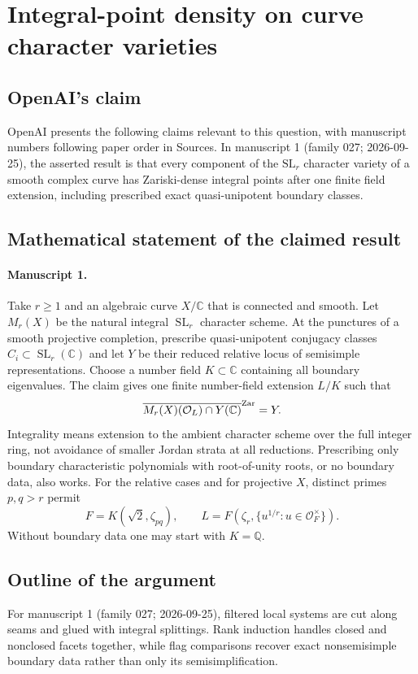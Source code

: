 \documentclass[11pt]{article}
\begin{document}
\section*{Integral-point density on curve character varieties}

\subsection{OpenAI's claim}
OpenAI presents the following claims relevant to this question, with manuscript numbers following paper order in Sources. In manuscript 1 (family 027; 2026-09-25), the asserted result is that every component of the $\mathrm{SL}_r$ character variety of a smooth complex curve has Zariski-dense integral points after one finite field extension, including prescribed exact quasi-unipotent boundary classes.

\subsection{Mathematical statement of the claimed result}
\paragraph{Manuscript 1.}
Take $r\ge1$ and an algebraic curve $X/\mathbb C$ that is connected and smooth. Let $M_r(X)$ be the natural integral $\operatorname{SL}_r$ character scheme. At the punctures of a smooth projective completion, prescribe quasi-unipotent conjugacy classes $C_i\subset\operatorname{SL}_r(\mathbb C)$ and let $Y$ be their reduced relative locus of semisimple representations. Choose a number field $K\subset\mathbb C$ containing all boundary eigenvalues. The claim gives one finite number-field extension $L/K$ such that
\[
 \overline{M_r(X)(\mathcal O_L)\cap Y(\mathbb C)}^{\rm Zar}=Y.
\]
Integrality means extension to the ambient character scheme over the full integer ring, not avoidance of smaller Jordan strata at all reductions. Prescribing only boundary characteristic polynomials with root-of-unity roots, or no boundary data, also works. For the relative cases and for projective $X$, distinct primes $p,q>r$ permit
\[
 F=K(\sqrt2,\zeta_{pq}),\qquad
 L=F(\zeta_r,\{u^{1/r}:u\in\mathcal O_F^{\times}\}).
\]
Without boundary data one may start with $K=\mathbb Q$.

\subsection{Outline of the argument}
For manuscript 1 (family 027; 2026-09-25), filtered local systems are cut along seams and glued with integral splittings. Rank induction handles closed and nonclosed facets together, while flag comparisons recover exact nonsemisimple boundary data rather than only its semisimplification.
\end{document}
